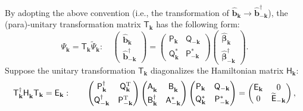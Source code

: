 By adopting the above convention (i.e., the transformation of $\hat{\bm b}_{\mathbf{k}} \rightarrow \hat{\bm b}^{\dagger}_{-\mathbf{k}}$), the (para)-unitary transformation matrix $\mathsf{T}_{\mathbf{k}}$ has the following form: 
\begin{equation}
    \Psi_{\mathbf{k}} = \mathsf{T}_{\mathbf{k}} \widetilde{\Psi}_{\mathbf{k}}: \quad
    \begin{pmatrix}
        \hat{\bm b}_{\mathbf{k}} \\
        \hat{\bm b}_{-\mathbf{k}}^{\dagger}
    \end{pmatrix}
    =
    \begin{pmatrix}
        \mathsf{P}_{\mathbf{k}}       & \mathsf{Q}_{-\mathbf{k}} \\ 
        \mathsf{Q}_{\mathbf{k}}^{*}   & \mathsf{P}_{-\mathbf{k}}^{*}
    \end{pmatrix}
    \begin{pmatrix}
        \hat{\bm \beta}_{ \mathbf{k}} \\
        \hat{\bm \beta}_{-\mathbf{k}}^{\dagger}
    \end{pmatrix}.
\end{equation}
Suppose the unitary transformation $\mathsf{T}_{\mathbf{k}}$ diagonalizes the Hamiltonian matrix $\mathsf{H}_{\mathbf{k}}$:
\begin{equation}
    \mathsf{T}_{\mathbf{k}}^{\dagger} \mathsf{H}_{\mathbf{k}}^{\phantom \dagger} \mathsf{T}_{\mathbf{k}} = \mathsf{E}_{\mathbf{k}}: \qquad
        \begin{pmatrix}
        \mathsf{P}_{\mathbf{k}}^{\dagger}     & \mathsf{Q}_{  \mathbf{k}}^{\rm T} \\[0.3em] 
        \mathsf{Q}_{-\mathbf{k}}^{\dagger}    & \mathsf{P}_{- \mathbf{k}}^{\rm T}
    \end{pmatrix}
    \begin{pmatrix}
        \mathsf{A}^{\phantom \dagger}_{\mathbf{k}}      &   \mathsf{B}^{\phantom \dagger}_{\mathbf{k}}\\[0.3em] 
        \mathsf{B}^\dagger_{\mathbf{k}}                 &   \mathsf{A}^*_{-\mathbf{k}}
    \end{pmatrix}
    \begin{pmatrix}
        \mathsf{P}_{\mathbf{k}}       & \mathsf{Q}_{-\mathbf{k}} \\[0.3em] 
        \mathsf{Q}_{\mathbf{k}}^{*}   & \mathsf{P}_{-\mathbf{k}}^{*}
    \end{pmatrix}
    =
    \begin{pmatrix}
        \mathsf{E}_{\mathbf{k}} & 0 \\ 0 & \widetilde{\mathsf{E}}_{-\mathbf{k}}
    \end{pmatrix},
\end{equation}
